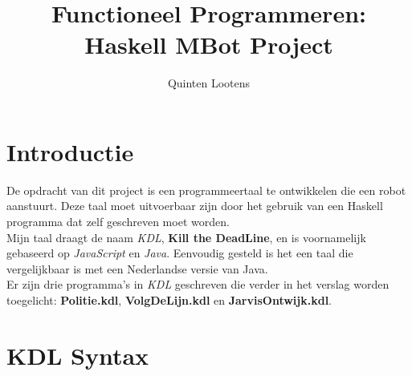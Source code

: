 \documentclass[a4paper]{article}
\title{Functioneel Programmeren: Haskell MBot Project}
\author{Quinten Lootens}
\begin{document}
\maketitle
{}
\section{Introductie}
De opdracht van dit project is een programmeertaal te ontwikkelen die een robot aanstuurt. Deze taal moet uitvoerbaar zijn door het gebruik van een Haskell programma dat zelf geschreven moet worden. \\
Mijn taal draagt de naam \textit{KDL}, \textbf{Kill the DeadLine}, en is voornamelijk gebaseerd op \textit{JavaScript} en \textit{Java}. Eenvoudig gesteld is het een taal die vergelijkbaar is met een Nederlandse versie van Java. \\
Er zijn drie programma's in \textit{KDL}  geschreven die verder in het verslag worden toegelicht: \textbf{Politie.kdl}, \textbf{VolgDeLijn.kdl} en \textbf{JarvisOntwijk.kdl}.



\section{KDL Syntax}
\end{document}
